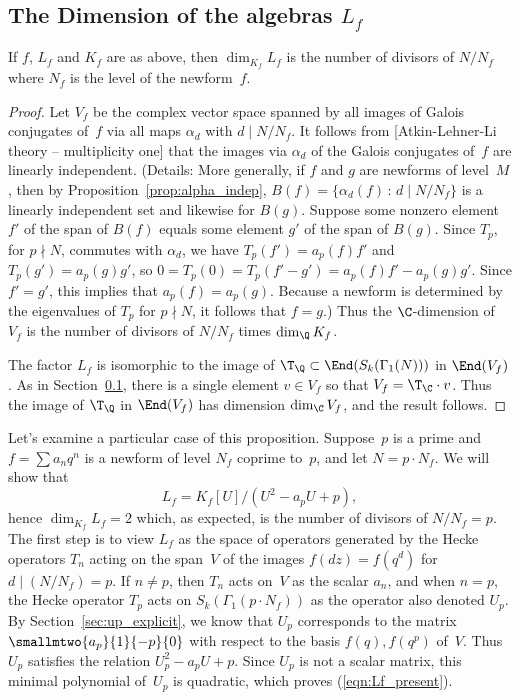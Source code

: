 \documentclass{report}
\begin{document}
\subsection{The Dimension of the algebras $L_f$}
\begin{proposition}\label{prop:dim_lf_kf}
If $f$, $L_f$ and $K_f$ are as above, then $\dim_{K_f} L_f$ is the
number of divisors of $N/N_f$ where $N_f$ is the level of the
newform~$f$.
\end{proposition}
\begin{proof}
Let $V_f$ be the complex vector space spanned by all images of
Galois conjugates of~$f$ via all maps $\alpha_d$ with $d\mid
N/N_f$. It follows from [Atkin-Lehner-Li theory -- multiplicity
one] that the images via $\alpha_d$ of the Galois
conjugates of~$f$ are linearly independent. (Details: More
generally, if $f$ and $g$ are newforms of level~$M$, then by
Proposition~\ref{prop:alpha_indep}, $B(f) = \{\alpha_{d}(f) \,:\,
d \mid N/N_f\}$ is a linearly independent set and likewise for
$B(g)$.  Suppose some nonzero element $f'$ of the span of $B(f)$
equals some element $g'$ of the span of $B(g)$.  Since $T_p$, for
$p\nmid N$, commutes with $\alpha_d$, we have $T_p(f')=a_p(f) f'$
and $T_p(g')=a_p(g)g'$, so $0=T_p(0)=T_p(f'-g') =
a_p(f)f'-a_p(g)g'$. Since $f'=g'$, this implies that
$a_p(f)=a_p(g)$.  Because a newform is determined by the
eigenvalues of $T_p$ for $p\nmid N$, it follows that $f=g$.) Thus
the $\C$-dimension of $V_f$ is the number of divisors of $N/N_f$
times $\dim_{\Q} K_f$.

The factor $L_f$ is isomorphic to the image of $\T_\Q\subset
\End(S_k(\Gamma_1(N)))$ in $\End(V_f)$.  As in Section~\ref{},
there is a single element $v\in V_f$ so that $V_f = \T_\C \cdot
v$. Thus the image of $\T_\Q$ in $\End(V_f)$ has dimension
$\dim_\C V_f$, and the result follows.
\end{proof}

Let's examine a particular case of this proposition. Suppose~$p$ is a
prime and~$f=\sum a_n q^n$ is a newform of level $N_f$ coprime to~$p$,
and let $N=p\cdot N_f$.  We will show that
\begin{equation}\label{eqn:Lf_present}
  L_f=K_f[U]/(U^2-a_p{}U+p),
\end{equation}
hence $\dim_{K_f} L_f=2$ which, as expected, is the number of divisors
of $N/N_f=p$. The first step is to view $L_f$ as the space of
operators generated by the Hecke operators $T_n$ acting on the span~$V$ of
the images $f(dz)=f(q^d)$ for $d\mid (N/N_f)=p$.  If $n\neq{}p$, then $T_n$
acts on~$V$ as the scalar $a_n$, and when $n=p$, the Hecke
operator $T_p$ acts on $S_k(\Gamma_1(p\cdot N_f))$ as the operator
also denoted $U_p$.  By Section~\ref{sec:up_explicit}, we know that
$U_p$ corresponds to the matrix $\smallmtwo{a_p}{1}{-p}{0}$ with
respect to the basis $f(q), f(q^p)$ of~$V$. Thus $U_p$ satisfies the relation
$U_p^2-a_pU+p$.  Since $U_p$ is not a scalar matrix, this minimal polynomial
of~$U_p$ is quadratic, which proves (\ref{eqn:Lf_present}).
\end{document}

